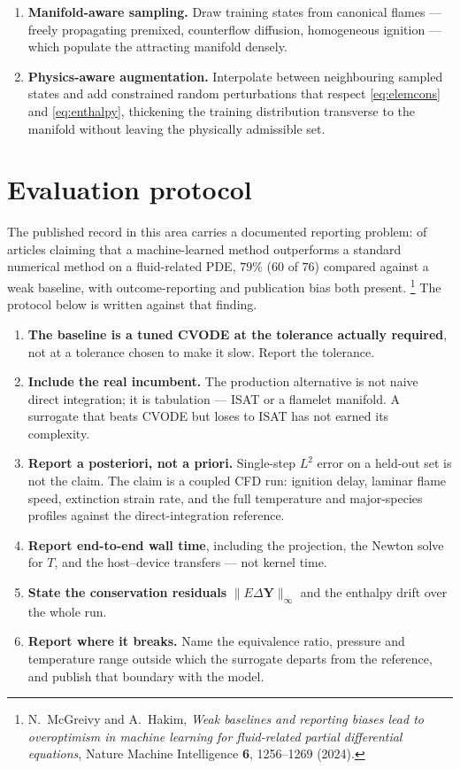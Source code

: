 \documentclass[11pt]{article}
\newcommand{\vv}[1]{\bm{#1}}
\newcommand{\Yv}{\vv{Y}}
\theoremstyle{plain}
\theoremstyle{definition}
\begin{document}
\begin{enumerate}[leftmargin=*]
\item \textbf{Manifold-aware sampling.} Draw training states from canonical
      flames --- freely propagating premixed, counterflow diffusion,
      homogeneous ignition --- which populate the attracting manifold densely.
\item \textbf{Physics-aware augmentation.} Interpolate between neighbouring
      sampled states and add constrained random perturbations that respect
      \eqref{eq:elemcons} and \eqref{eq:enthalpy}, thickening the training
      distribution transverse to the manifold without leaving the physically
      admissible set.
\end{enumerate}

\section{Evaluation protocol}

The published record in this area carries a documented reporting problem: of
articles claiming that a machine-learned method outperforms a standard
numerical method on a fluid-related PDE, $79\%$ ($60$ of $76$) compared against
a weak baseline, with outcome-reporting and publication bias both present.\!%
\footnote{N.~McGreivy and A.~Hakim, \emph{Weak baselines and reporting biases
lead to overoptimism in machine learning for fluid-related partial differential
equations}, Nature Machine Intelligence \textbf{6}, 1256--1269 (2024).}
The protocol below is written against that finding.

\begin{enumerate}[leftmargin=*]
\item \textbf{The baseline is a tuned CVODE at the tolerance actually required},
      not at a tolerance chosen to make it slow. Report the tolerance.
\item \textbf{Include the real incumbent.} The production alternative is not
      naive direct integration; it is tabulation --- ISAT or a flamelet
      manifold. A surrogate that beats CVODE but loses to ISAT has not earned
      its complexity.
\item \textbf{Report a posteriori, not a priori.} Single-step $L^2$ error on a
      held-out set is not the claim. The claim is a coupled CFD run: ignition
      delay, laminar flame speed, extinction strain rate, and the full
      temperature and major-species profiles against the direct-integration
      reference.
\item \textbf{Report end-to-end wall time}, including the projection, the
      Newton solve for $T$, and the host--device transfers --- not kernel time.
\item \textbf{State the conservation residuals} $\|E\Delta\Yv\|_\infty$ and the
      enthalpy drift over the whole run.
\item \textbf{Report where it breaks.} Name the equivalence ratio, pressure and
      temperature range outside which the surrogate departs from the reference,
      and publish that boundary with the model.
\end{enumerate}
\end{document}
